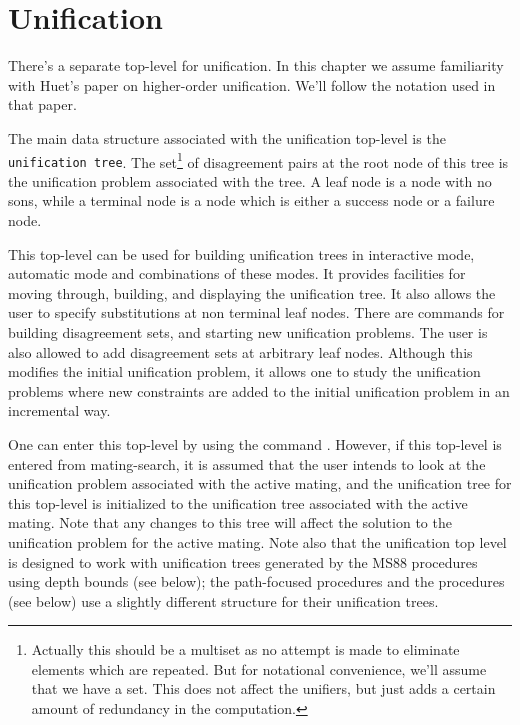 \chapter{Unification}
There's a separate top-level for unification. In this
chapter we assume familiarity with Huet's paper on higher-order unification.
We'll follow the notation used in that paper.

The main data structure associated with the unification top-level is the
{\tt unification tree}. The set\footnote{Actually this should be a multiset as
no attempt is made to eliminate elements which are repeated. But for notational
convenience, we'll assume that we have a set. This does not affect the
unifiers, but just adds a certain amount of redundancy in the computation.}
of disagreement pairs at the root node of this
tree is the unification problem associated with the tree. A leaf node is a node
with no sons, while a terminal node is a node which is either a success node or
a failure node.

This top-level can be used for building unification trees in interactive mode,
automatic mode and combinations of these modes. It provides
facilities for moving through, building, and displaying the unification tree.
It also allows the user to specify substitutions at non terminal leaf nodes.
There are commands for building disagreement sets, and starting new
unification problems. The user is also allowed to add disagreement sets
at arbitrary leaf nodes. Although this modifies the initial unification
problem, it allows one to study the unification problems where new
constraints are added to the initial unification problem in an incremental
way.

One can enter this top-level by using the command
. However, if this top-level is entered from
mating-search, it is assumed that the user intends to look at the
unification problem associated with the active mating, and the unification
tree for this top-level is initialized to the unification tree associated with
the active mating. Note that any changes to this tree will affect the solution
to the unification problem for the active mating. Note also that the unification
top level is designed to work with unification trees generated by the MS88
procedures using depth bounds (see below); the path-focused procedures and the
 procedures (see below) use a slightly  different structure
for their unification trees.

